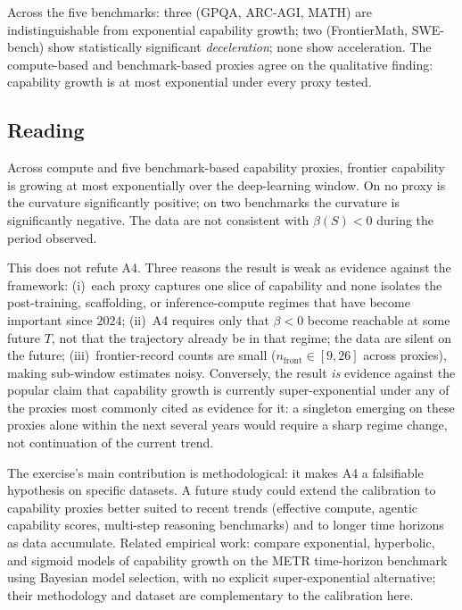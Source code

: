 \documentclass[11pt,letterpaper]{article}
\theoremstyle{plain}
\theoremstyle{definition}
\theoremstyle{remark}
\begin{document}
Across the five benchmarks: three (GPQA, ARC-AGI, MATH) are
indistinguishable from exponential capability growth; two
(FrontierMath, SWE-bench) show statistically significant
\emph{deceleration}; none show acceleration.
The compute-based and benchmark-based proxies agree on the qualitative
finding: capability growth is at most exponential under every proxy
tested.

\subsection{Reading}

Across compute and five benchmark-based capability proxies, frontier
capability is growing at most exponentially over the deep-learning
window.
On no proxy is the curvature significantly positive; on two benchmarks
the curvature is significantly negative.
The data are not consistent with $\beta(S) < 0$ during the period
observed.

This does not refute A4.
Three reasons the result is weak as evidence against the framework:
(i)~each proxy captures one slice of capability and none isolates the
post-training, scaffolding, or inference-compute regimes that have
become important since $2024$;
(ii)~A4 requires only that $\beta < 0$ become reachable at some future
$T$, not that the trajectory already be in that regime; the data are
silent on the future;
(iii)~frontier-record counts are small ($n_{\mathrm{front}} \in [9, 26]$
across proxies), making sub-window estimates noisy.
Conversely, the result \emph{is} evidence against the popular claim
that capability growth is currently super-exponential under any of the
proxies most commonly cited as evidence for it: a singleton emerging
on these proxies alone within the next several years would require a
sharp regime change, not continuation of the current trend.

The exercise's main contribution is methodological: it makes A4 a
falsifiable hypothesis on specific datasets.
A future study could extend the calibration to capability proxies
better suited to recent trends (effective compute, agentic
capability scores, multi-step reasoning benchmarks) and to longer time
horizons as data accumulate.
Related empirical work: \citet{ge2026exponential} compare exponential,
hyperbolic, and sigmoid models of capability growth on the METR
time-horizon benchmark using Bayesian model selection, with no
explicit super-exponential alternative; their methodology and dataset
are complementary to the calibration here.
\end{document}
